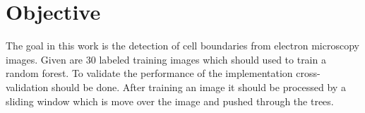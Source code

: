 \section{Objective}
\label{sec:objective}

The goal in this work is the detection of cell boundaries from electron microscopy images. Given are 30 labeled training images which should used to train a random forest.
To validate the performance of the implementation cross-validation should be done.
After training an image it should be processed by a sliding window which is move over the image and pushed through the trees.